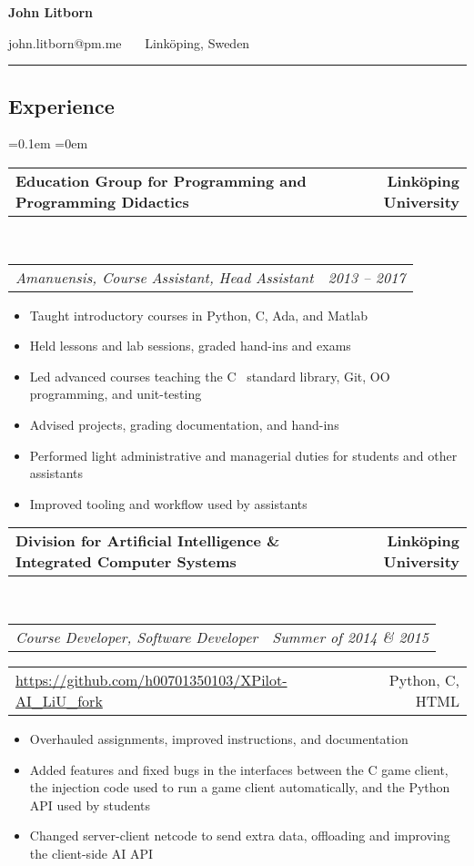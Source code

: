 \documentclass[10pt,letterpaper]{article}
\makeatletter
\newcommand{\headerrow}[2]
{\begin{tabular*}{\linewidth}{l@{\extracolsep{\fill}}r}
	#1 &
	#2 \\
\end{tabular*}}
\newcommand{\CPP}
{C\nolinebreak[4]\hspace{-.05em}\raisebox{.22ex}{\footnotesize\bf ++}}
\makeatother
\begin{document}
\begin{center}
    {\LARGE \textbf{John Litborn}}

    john.litborn@pm.me
    \ \textbullet \ \
    Linköping, Sweden
\end{center}

\hrule
\vspace{-0.4em}
\subsection*{Experience}

\parskip=0.1em
\parindent=0em
\headerrow
{\textbf{Education Group for Programming and Programming
Didactics}}
{\textbf{Linköping University}}
\\
\headerrow
{\emph{Amanuensis, Course Assistant, Head Assistant}}
{\emph{2013 -- 2017}}
\begin{itemize}[noitemsep, topsep=0pt]
    \item Taught introductory courses in Python, \CPP, Ada, and Matlab
    \item Held lessons and lab sessions, graded hand-ins and exams
    \item Led advanced courses teaching the \CPP
        \ standard library, Git, OO programming, and
        unit-testing
    \item Advised projects, grading documentation, and hand-ins
    \item Performed light administrative and managerial duties for students
        and other assistants
    \item Improved tooling and workflow used by assistants
\end{itemize}
\vspace{0.5em}
\headerrow
{\textbf{Division for Artificial Intelligence \& Integrated Computer Systems}}
{\textbf{Linköping University}}
\\
\headerrow
{\emph{Course Developer, Software Developer}}
{\emph{Summer of 2014 \& 2015}}
\headerrow
{\url{https://github.com/h00701350103/XPilot-AI\_LiU\_fork}}
{Python, C, HTML}
\begin{itemize}[noitemsep, topsep=0pt]
    \item Overhauled assignments, improved instructions, and
        documentation
    \item Added features and fixed bugs in the interfaces
        between the C game client, the injection code used to run a game
        client automatically, and the Python API used by students
    \item Changed server-client netcode to send extra data, offloading and
        improving the client-side AI API
\end{itemize}
\vspace{0.5em}
\end{document}
